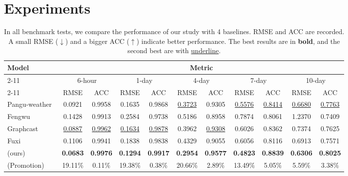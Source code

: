 \section{Experiments}
\begin{table*}[t]
    \caption{In all benchmark tests, we compare the performance of our study with 4 baselines. RMSE and ACC are recorded. A small RMSE ($\downarrow$) and a bigger ACC ($\uparrow$) indicate better performance. The best results are in \textbf{bold}, and the second best are with \underline{underline}.
}
    \small
    \label{tab:mainres}
    \vspace{-5pt}
    \vskip 0.13in
    \centering
    \begin{small}
        \begin{sc}
            \renewcommand{\multirowsetup}{\centering}
            \setlength{\tabcolsep}{2.8pt} %
            \begin{tabular}{l|cc|cc|cc|cc|cc}
                \toprule
                \multirow{4}{*}{Model} & \multicolumn{10}{c}{Metric}  \\
                \cmidrule(lr){2-11}
                &  \multicolumn{2}{c}{6-hour} & \multicolumn{2}{c}{1-day} & \multicolumn{2}{c}{4-day} & \multicolumn{2}{c}{7-day} & \multicolumn{2}{c}{10-day}   \\
                \cmidrule(lr){2-11}
               & RMSE& ACC & RMSE& ACC & RMSE& ACC & RMSE& ACC & RMSE& ACC \\

                \midrule
                Pangu-weather~\cite{bi2023accurate} &0.0921&0.9958 &0.1635&0.9868&\underline{0.3723}&0.9305&\underline{0.5576}&\underline{0.8414}&\underline{0.6680}&\underline{0.7763}     \\
                Fengwu~\cite{chen2023fengwu} &0.1428  &0.9913 &0.2584 &0.9738  &0.5186 &0.8958 & 0.7874&0.8061 &1.2370  &0.7409    \\
                Graphcast~\cite{lam2023learning} &\underline{0.0887}  &\underline{0.9962} &\underline{0.1634} &\underline{0.9878}  &0.3962 &\underline{0.9308} &0.6026&0.8362 &0.7374  &0.7625    \\
                Fuxi~\cite{chen2023fuxi} &0.1106 & 0.9941 &0.1838&0.9838  &0.4329&0.9055& 0.6056&0.8116&  0.6913&0.7571  \\
                \midrule
                \method{}(ours) &\textbf{0.0683} &\textbf{0.9976} &\textbf{0.1294}&\textbf{0.9917}&\textbf{0.2954}&\textbf{0.9577}& \textbf{0.4823}&\textbf{0.8839}&\textbf{0.6306}&\textbf{0.8025}  \\
                \midrule
                \method{}(Promotion) &19.11\% &0.11\% &19.38\%&0.38\%&20.66\%&2.89\%& 13.49\%&5.05\%&5.59\%&3.38\%  \\

                \bottomrule
            \end{tabular}
        \end{sc}
	\end{small}
    \vspace{-5pt}
\end{table*}

